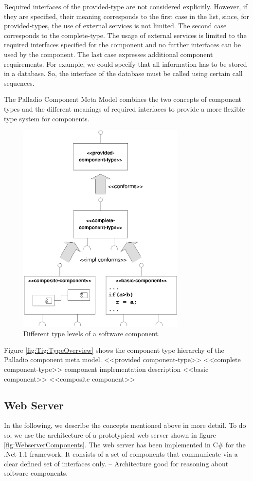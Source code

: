 Required interfaces of the provided-type are not considered explicitly. However,
if they are specified, their meaning corresponds to the first case in the list,
since, for provided-types, the use of external services is not limited. The
second case corresponds to the complete-type. The usage of external services is
limited to the required interfaces specified for the component and no further
interfaces can be used by the component. The last case expresses additional
component requirements. For example, we could specify that all information has
to be stored in a database. So, the interface of the database must be called
using certain call sequences.

The Palladio Component Meta Model combines the two concepts of component types
and the different meanings of required interfaces to provide a more flexible
type system for components.

\begin{figure}[htbp]
\centering
\includegraphics[width=3.3in]{example/Overview_TypeHierarchie}
\caption{Different type levels of a software component.}
\label{fig:TypeOverview}
\end{figure}

Figure \ref{fig:Tig:TypeOverview} shows the component type
hierarchy of the Palladio component meta model.
<<provided component-type>>
<<complete component-type>>
component implementation description
<<basic component>> <<composite component>>


\subsection{Web Server}
In the following, we describe the concepts mentioned above in more detail. To do
so, we use the architecture of a prototypical web server shown in figure
\ref{fig:WebserverComponents}. The web server has been implemented in C\# for
the .Net 1.1 framework. It consists of a set of components that
communicate via a clear defined set of interfaces only. -- Architecture good
for reasoning about software components.

